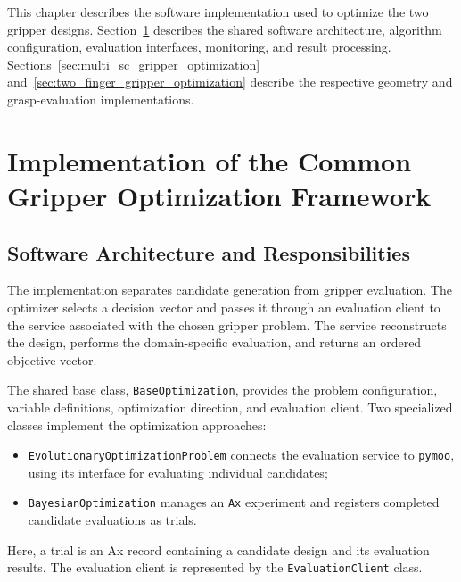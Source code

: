 
This chapter describes the software implementation used to optimize the two gripper
designs. Section~\ref{sec:gripper_optimization_framework} describes the shared software
architecture, algorithm configuration, evaluation interfaces, monitoring, and
result processing. Sections~\ref{sec:multi_sc_gripper_optimization}
and~\ref{sec:two_finger_gripper_optimization} describe the respective geometry
and grasp-evaluation implementations.

\section{Implementation of the Common Gripper Optimization Framework}
\label{sec:gripper_optimization_framework}

\subsection{Software Architecture and Responsibilities}
\label{sec:optimization_framework_sc}
\label{sec:two_finger_framework}

The implementation separates candidate generation from gripper evaluation.
The optimizer selects a decision vector and passes it through an evaluation
client to the service associated with the chosen gripper problem. The service
reconstructs the design, performs the domain-specific evaluation, and returns
an ordered objective vector.

The shared base class, \texttt{BaseOptimization}, provides the problem
configuration, variable definitions, optimization direction, and evaluation
client. Two specialized classes implement the optimization approaches:
\begin{itemize}
    \item \texttt{EvolutionaryOptimizationProblem} connects the evaluation
          service to \texttt{pymoo}, using its interface for evaluating
          individual candidates;
    \item \texttt{BayesianOptimization} manages an \texttt{Ax} experiment and registers
          completed candidate evaluations as trials.
\end{itemize}
Here, a trial is an Ax record containing a candidate design and its evaluation
results. The evaluation client is represented by the
\texttt{EvaluationClient} class.

